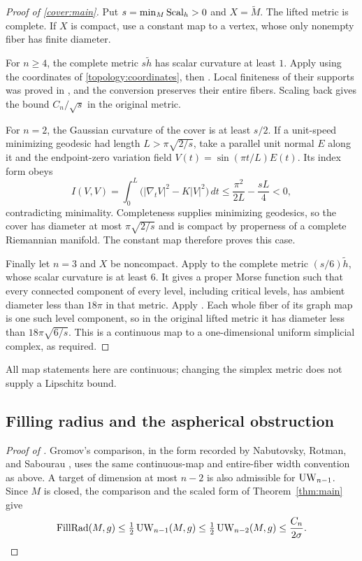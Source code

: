 \begin{proof}[Proof of \cref{cover:main}]
Put $s=\min_M\operatorname{Scal}_h>0$ and $X=\widetilde M$.  The lifted metric
is complete.  If $X$ is compact, use a constant map to a vertex,
whose only nonempty fiber has finite diameter.

For $n\ge4$, the complete metric $s\widetilde h$ has scalar
curvature at least $1$.  Apply  using the coordinates
of \eqref{topology:coordinates}, then .  Local
finiteness of their supports was proved in
, and the conversion preserves their
entire fibers.  Scaling back gives the bound $C_n/\sqrt{s}$ in
the original metric.

For $n=2$, the Gaussian curvature of the cover is at least $s/2$.
If a unit-speed minimizing geodesic had length $L>\pi\sqrt{2/s}$,
take a parallel unit normal $E$ along it and the endpoint-zero
variation field $V(t)=\sin(\pi t/L)E(t)$.  Its index form obeys
\[
 I(V,V)=\int_0^L\bigl(|\nabla_tV|^2-K|V|^2\bigr)\,dt
 \le \frac{\pi^2}{2L}-\frac{sL}{4}<0,
\]
contradicting minimality.  Completeness supplies minimizing geodesics,
so the cover has diameter at most $\pi\sqrt{2/s}$ and is compact
by properness of a complete Riemannian manifold.  The constant map therefore proves this case.

Finally let $n=3$ and $X$ be noncompact.  Apply
\citet[Theorem~1.1, arXiv version~1]{liokumovichWang2023} to the
complete metric $(s/6)\widetilde h$, whose scalar curvature is at
least $6$.  It gives a proper Morse function such that every
connected component of every level, including critical levels, has
ambient diameter less than $18\pi$ in that metric.  Apply
.  Each whole fiber of its graph map is one such
level component, so in the original lifted metric it has diameter
less than $18\pi\sqrt{6/s}$.  This is a continuous map to a
one-dimensional uniform simplicial complex, as required.
\end{proof}

All map statements here are continuous; changing the simplex metric
does not supply a Lipschitz bound.

\subsection{Filling radius and the aspherical obstruction}

\begin{proof}[Proof of ]
Gromov's comparison, in the form recorded by Nabutovsky, Rotman, and
Sabourau \citep[Definition~6.1 and equation~(6.1)]{nabutovskyRotmanSabourau2021},
uses the same continuous-map and entire-fiber width convention as above.
A target of dimension at most \(n-2\) is also admissible for
\(\operatorname{UW}_{n-1}\). Since \(M\) is closed, the comparison and the scaled
form of Theorem~\ref{thm:main} give
\[
 \operatorname{FillRad}(M,g)
 \le \tfrac12\operatorname{UW}_{n-1}(M,g)
 \le \tfrac12\operatorname{UW}_{n-2}(M,g)
 \le \frac{C_n}{2\sigma}.
\]
\end{proof}

